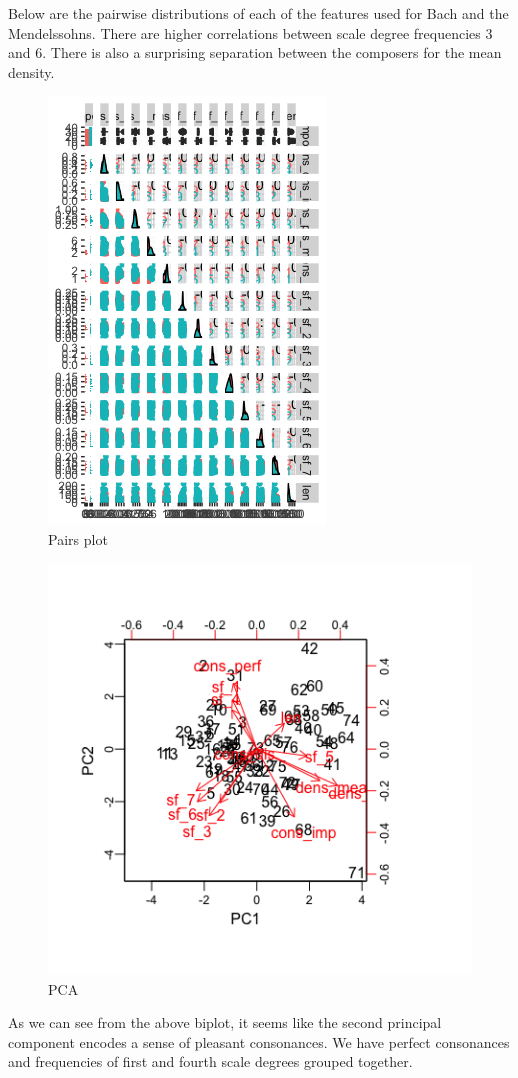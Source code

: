 \documentclass[12pt,twoside]{reedthesis}
\theoremstyle{definition}
\theoremstyle{definition}
\theoremstyle{definition}
\theoremstyle{remark}
\begin{document}
Below are the pairwise distributions of each of the features used for
Bach and the Mendelssohns. There are higher correlations between scale
degree frequencies 3 and 6. There is also a surprising separation
between the composers for the mean density.
\begin{figure}
\centering
\includegraphics{images/Couplet.png}
\caption{\label{fig:unnamed-chunk-4}Pairs plot}
\end{figure}
\begin{figure}
\centering
\includegraphics{images/PCA_bach.png}
\caption{\label{fig:unnamed-chunk-5}PCA}
\end{figure}
As we can see from the above biplot, it seems like the second principal
component encodes a sense of pleasant consonances. We have perfect
consonances and frequencies of first and fourth scale degrees grouped
together.
\end{document}
